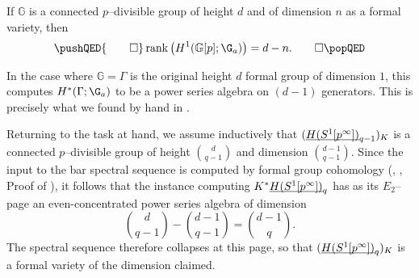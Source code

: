 \begin{lemma}
If \(\mathbb G\) is a connected \(p\)--divisible group of height \(d\) and of dimension \(n\) as a formal variety, then
\[\pushQED{\qed}
\operatorname{rank}\left(H^1(\mathbb G[p]; \G_a)\right) = d - n. \qedhere
\popQED\]
\end{lemma}

\begin{remark}
In the case where \(\mathbb G = \Gamma\) is the original height \(d\) formal group of dimension \(1\), this computes \(H^*(\Gamma; \G_a)\) to be a power series algebra on \((d-1)\) generators.  This is precisely what we found by hand in .
\end{remark}

\noindent Returning to the task at hand, we assume inductively that \((\OS{H(S^1[p^\infty])}{q-1})_K\) is a connected \(p\)--divisible group of height \(\binom{d}{q-1}\) and dimension \(\binom{d-1}{q-1}\).  Since the input to the bar spectral sequence is computed by formal group cohomology (\cite{LazarevDeformations}, \cite[Example 2.3.5]{HopkinsLurie}, Proof of ), it follows that the instance computing \(K^* \OS{H(S^1[p^\infty])}{q}\) has as its \(E_2\)--page an even-concentrated power series algebra of dimension \[\binom{d}{q-1} - \binom{d-1}{q-1} = \binom{d-1}{q}.\]  The spectral sequence therefore collapses at this page, so that \((\OS{H(S^1[p^\infty])}{q})_K\) is a formal variety of the dimension claimed.

